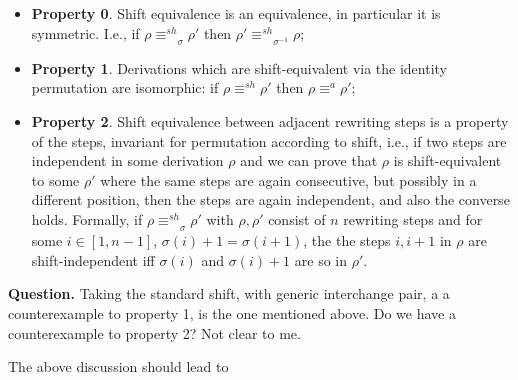 \documentclass{llncs}
\newcommand{\interval}[2][1]{\ensuremath{[{#1},{#2}]}}
\newcommand{\shifteq}[1][]{\ensuremath{\mathrel{{\equiv}^\mathit{sh}_{#1}}}}
\begin{document}
\begin{itemize}
\item \textbf{Property 0}. Shift equivalence is an equivalence, in particular it is symmetric. I.e., if  $\rho \shifteq_\sigma \rho'$ then $\rho' \shifteq_{\sigma^{-1}} \rho$; 

\item \textbf{Property 1}. Derivations which are shift-equivalent via the
  identity permutation are isomorphic: if $\rho \shifteq \rho'$ then
  $\rho \equiv^a \rho'$; 
  
\item \textbf{Property 2}. Shift equivalence between adjacent rewriting steps
  is a property of the steps, invariant for permutation according to
  shift, i.e., if two steps are independent in some derivation $\rho$
  and we can prove that $\rho$ is shift-equivalent to some $\rho'$
  where the same steps are again consecutive, but possibly in a
  different position, then the steps are again independent, and also
  the converse holds. Formally, if $\rho \shifteq_\sigma \rho'$ with
  $\rho, \rho'$ consist of $n$ rewriting steps and for some
  $i \in \interval{n-1}$, $\sigma(i)+1 = \sigma(i+1)$, the the steps
  $i, i+1$ in $\rho$ are shift-independent iff $\sigma(i)$ and
  $\sigma(i)+1$ are so in $\rho'$.
\end{itemize}




\textbf{Question.} Taking the standard shift, with generic interchange pair, a a counterexample to property 1, is the one mentioned above.  Do we have a counterexample to property 2? Not clear to me.


The above discussion should lead to
\end{document}
